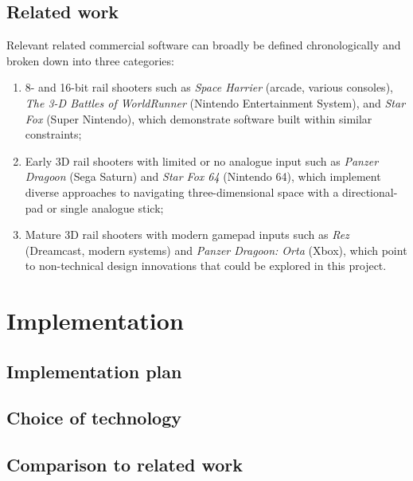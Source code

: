 \documentclass{article}
\begin{document}
\subsection*{Related work}
Relevant related commercial software can broadly be defined
chronologically and broken down into three categories:

\begin{enumerate}
    \item 8- and 16-bit rail shooters such as 
    \textit{Space Harrier} (arcade, various consoles),
    \textit{The 3-D Battles of WorldRunner} (Nintendo Entertainment System), and 
    \textit{Star Fox} (Super Nintendo),
    which demonstrate software built within similar constraints;
    
    \item Early 3D rail shooters with limited or no analogue input such as 
    \textit{Panzer Dragoon} (Sega Saturn) and
    \textit{Star Fox 64} (Nintendo 64),
    which implement diverse approaches to navigating three-dimensional space with a directional-pad or
    single analogue stick;
    
    \item Mature 3D rail shooters with modern gamepad inputs such as 
    \textit{Rez} (Dreamcast, modern systems) and
    \textit{Panzer Dragoon: Orta} (Xbox),
    which point to non-technical design innovations that could be explored in this project.
\end{enumerate}


\section{Implementation}
\subsection*{Implementation plan}

\subsection*{Choice of technology}
\subsection*{Comparison to related work}

\end{document}
